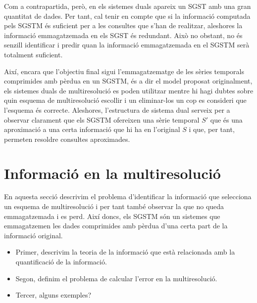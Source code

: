 Com a contrapartida, però, en els sistemes duals apareix un \gls{SGST}
amb una gran quantitat de dades. Per tant, cal tenir en compte que si
la informació computada pels \gls{SGSTM} és suficient per a les
consultes que s'han de realitzar, aleshores la informació
emmagatzemada en els \gls{SGST} és redundant. Això no obstant, no és
senzill identificar i predir quan la informació emmagatzemada en el
\gls{SGSTM} serà totalment suficient.



Així, encara que l'objectiu final sigui l'emmagatzematge de les sèries
temporals comprimides amb pèrdua en un \gls{SGSTM}, és a dir el model
proposat originalment, els sistemes duals de multiresolució es poden
utilitzar mentre hi hagi dubtes sobre quin esquema de multiresolució
escollir i un eliminar-los un cop es consideri que l'esquema és
correcte. Aleshores, l'estructura de sistema dual serveix per a
observar clarament que els \gls{SGSTM} ofereixen una sèrie temporal
$S'$ que és una aproximació a una certa informació que hi ha en
l'original $S$ i que, per tant, permeten resoldre consultes
aproximades.











\section{Informació en la multiresolució}

\todo{} 
En aquesta secció descrivim el problema d'identificar la
informació que selecciona un esquema de multiresolució i per tant
també observar la que no queda emmagatzemada i es perd.  Així doncs,
els \gls{SGSTM} són un sistemes que emmagatzemen les dades comprimides
amb pèrdua d'una certa part de la informació original.


\begin{itemize}
\item Primer, descrivim la teoria de la informació que està
  relacionada amb la quantificació de la informació.
\item Segon, definim el problema de calcular l'error en la multiresolució.
\item Tercer, alguns exemples?
\end{itemize}




